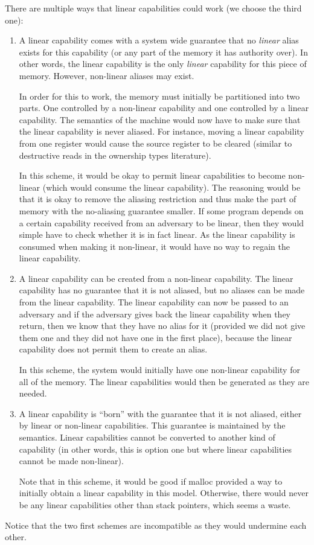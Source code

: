 \documentclass[a3paper]{article}
\begin{document}
There are multiple ways that linear capabilities could work (we choose the third one):
\begin{enumerate}
\item A linear capability comes with a system wide guarantee that no \emph{linear} alias exists for this capability (or any part of the memory it has authority over). In other words, the linear capability is the only \emph{linear} capability for this piece of memory.  However, non-linear aliases may exist.

In order for this to work, the memory must initially be partitioned into two parts. One controlled by a non-linear capability and one controlled by a linear capability. The semantics of the machine would now have to make sure that the linear capability is never aliased. For instance, moving a linear capability from one register would cause the source register to be cleared (similar to destructive reads in the ownership types literature). 

In this scheme, it would be okay to permit linear capabilities to become non-linear (which would consume the linear capability). The reasoning would be that it is okay to remove the aliasing restriction and thus make the part of memory with the no-aliasing guarantee smaller. If some program depends on a certain capability received from an adversary to be linear, then they would simple have to check whether it is in fact linear. As the linear capability is consumed when making it non-linear, it would have no way to regain the linear capability.

\item A linear capability can be created from a non-linear capability. The linear capability has no guarantee that it is not aliased, but no aliases can be made from the linear capability. The linear capability can now be passed to an adversary and if the adversary gives back the linear capability when they return, then we know that they have no alias for it (provided we did not give them one and they did not have one in the first place), because the linear capability does not permit them to create an alias.

In this scheme, the system would initially have one non-linear capability for all of the memory. The linear capabilities would then be generated as they are needed.
\item A linear capability is ``born'' with the guarantee that it is not aliased, either by linear or non-linear capabilities. This guarantee is maintained by the semantics. Linear capabilities cannot be converted to another kind of capability (in other words, this is option one but where linear capabilities cannot be made non-linear).

Note that in this scheme, it would be good if malloc provided a way to initially obtain a linear capability in this model.
Otherwise, there would never be any linear capabilities other than stack pointers, which seems a waste.
\end{enumerate}
Notice that the two first schemes are incompatible as they would undermine each other.
\end{document}
